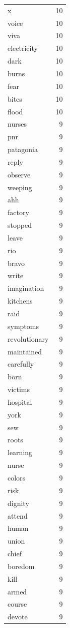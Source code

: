 \begin{tabular}{lr}
x & 10 \\
voice & 10 \\
viva & 10 \\
electricity & 10 \\
dark & 10 \\
burns & 10 \\
fear & 10 \\
bites & 10 \\
flood & 10 \\
nurses & 9 \\
pnr & 9 \\
patagonia & 9 \\
reply & 9 \\
observe & 9 \\
weeping & 9 \\
ahh & 9 \\
factory & 9 \\
stopped & 9 \\
leave & 9 \\
rio & 9 \\
bravo & 9 \\
write & 9 \\
imagination & 9 \\
kitchens & 9 \\
raid & 9 \\
symptoms & 9 \\
revolutionary & 9 \\
maintained & 9 \\
carefully & 9 \\
born & 9 \\
victims & 9 \\
hospital & 9 \\
york & 9 \\
sew & 9 \\
roots & 9 \\
learning & 9 \\
nurse & 9 \\
colors & 9 \\
risk & 9 \\
dignity & 9 \\
attend & 9 \\
human & 9 \\
union & 9 \\
chief & 9 \\
boredom & 9 \\
kill & 9 \\
armed & 9 \\
course & 9 \\
devote & 9 \\

\end{tabular}
